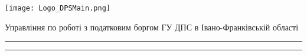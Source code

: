 	\begin{minipage}{0.45\textwidth}
	\texttt{[image: Logo\_DPSMain.png]} 
	\end{minipage}
\hfill
\hfill
	\begin{minipage}{0.45\textwidth}
		\begin{center}
	Управління по роботі з податковим боргом ГУ ДПС в Івано-Франківській області
		\end{center}
   \end{minipage}

\bigskip

\hrule height 2pt\smallskip
\hrule height 0.5pt%
\bigskip
